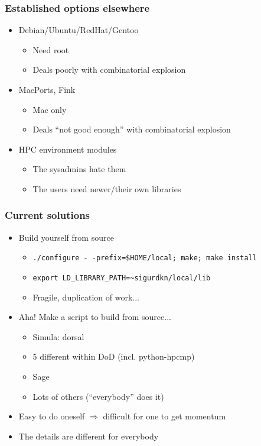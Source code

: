 \documentclass[sans,mathserif]{beamer}
\begin{document}
\begin{frame}
  \frametitle{Established options elsewhere}

  \begin{itemize}
  \item<+-> Debian/Ubuntu/RedHat/Gentoo
    \begin{itemize}
    \item<+-> Need root
    \item<+-> Deals poorly with combinatorial explosion
    \end{itemize}
  \item<+-> MacPorts, Fink
    \begin{itemize}
    \item<+-> Mac only
    \item<+-> Deals ``not good enough'' with combinatorial explosion
    \end{itemize}
  \item<+-> HPC environment modules
    \begin{itemize}
    \item<+-> The sysadmins hate them
    \item<+-> The users need newer/their own libraries
    \end{itemize}
  \end{itemize}

\end{frame}

\begin{frame}
  \frametitle{Current solutions}
  \begin{itemize}
  \item<+-> Build yourself from source
    \begin{itemize}
    \item<+-> {\tt ./configure -\,{}-prefix=\$HOME/local; make; make install}
    \item<+-> {\tt export LD\_LIBRARY\_PATH=\textasciitilde{}sigurdkn/local/lib}
    \item<+-> Fragile, duplication of work...
    \end{itemize}
  \item<+-> Aha! Make a script to build from source...
    \begin{itemize}
    \item Simula: dorsal
    \item 5 different within DoD (incl. python-hpcmp)
    \item Sage
    \item Lots of others (``everybody'' does it)
    \end{itemize}
  \item<+-> Easy to do oneself $\Rightarrow$ difficult for one to get
    momentum
  \item<+-> The details are different for everybody
  \end{itemize}

\end{frame}
\end{document}
